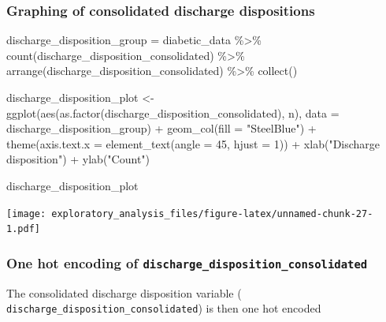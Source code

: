 \documentclass[
]{article}
\newenvironment{Shaded}{\begin{snugshade}}{\end{snugshade}}
\newcommand{\AttributeTok}[1]{\textcolor[rgb]{0.77,0.63,0.00}{#1}}
\newcommand{\DecValTok}[1]{\textcolor[rgb]{0.00,0.00,0.81}{#1}}
\newcommand{\FunctionTok}[1]{\textcolor[rgb]{0.00,0.00,0.00}{#1}}
\newcommand{\NormalTok}[1]{#1}
\newcommand{\OtherTok}[1]{\textcolor[rgb]{0.56,0.35,0.01}{#1}}
\newcommand{\SpecialCharTok}[1]{\textcolor[rgb]{0.00,0.00,0.00}{#1}}
\newcommand{\StringTok}[1]{\textcolor[rgb]{0.31,0.60,0.02}{#1}}
\begin{document}
\hypertarget{graphing-of-consolidated-discharge-dispositions}{%
\subsubsection{Graphing of consolidated discharge
dispositions}\label{graphing-of-consolidated-discharge-dispositions}}

\begin{Shaded}
\begin{Highlighting}[]
\NormalTok{discharge\_disposition\_group }\OtherTok{=}\NormalTok{ diabetic\_data }\SpecialCharTok{\%\textgreater{}\%}
    \FunctionTok{count}\NormalTok{(discharge\_disposition\_consolidated) }\SpecialCharTok{\%\textgreater{}\%}
    \FunctionTok{arrange}\NormalTok{(discharge\_disposition\_consolidated) }\SpecialCharTok{\%\textgreater{}\%}
    \FunctionTok{collect}\NormalTok{()}

\NormalTok{discharge\_disposition\_plot }\OtherTok{\textless{}{-}} \FunctionTok{ggplot}\NormalTok{(}\FunctionTok{aes}\NormalTok{(}\FunctionTok{as.factor}\NormalTok{(discharge\_disposition\_consolidated),}
\NormalTok{    n), }\AttributeTok{data =}\NormalTok{ discharge\_disposition\_group) }\SpecialCharTok{+} \FunctionTok{geom\_col}\NormalTok{(}\AttributeTok{fill =} \StringTok{"SteelBlue"}\NormalTok{) }\SpecialCharTok{+}
    \FunctionTok{theme}\NormalTok{(}\AttributeTok{axis.text.x =} \FunctionTok{element\_text}\NormalTok{(}\AttributeTok{angle =} \DecValTok{45}\NormalTok{, }\AttributeTok{hjust =} \DecValTok{1}\NormalTok{)) }\SpecialCharTok{+}
    \FunctionTok{xlab}\NormalTok{(}\StringTok{"Discharge disposition"}\NormalTok{) }\SpecialCharTok{+} \FunctionTok{ylab}\NormalTok{(}\StringTok{"Count"}\NormalTok{)}

\NormalTok{discharge\_disposition\_plot}
\end{Highlighting}
\end{Shaded}

\texttt{[image: exploratory\_analysis\_files/figure-latex/unnamed-chunk-27-1.pdf]}

\hypertarget{one-hot-encoding-of-discharge_disposition_consolidated}{%
\subsubsection{\texorpdfstring{One hot encoding of
\texttt{discharge\_disposition\_consolidated}}{One hot encoding of discharge\_disposition\_consolidated}}\label{one-hot-encoding-of-discharge_disposition_consolidated}}

The consolidated discharge disposition variable (
\texttt{discharge\_disposition\_consolidated}) is then one hot encoded
\end{document}
